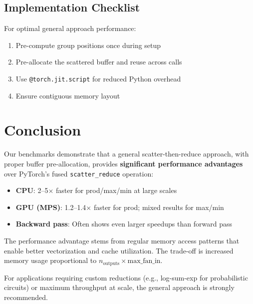 \documentclass[11pt]{article}
\begin{document}
\subsection{Implementation Checklist}

For optimal general approach performance:
\begin{enumerate}
    \item Pre-compute group positions once during setup
    \item Pre-allocate the scattered buffer and reuse across calls
    \item Use \texttt{@torch.jit.script} for reduced Python overhead
    \item Ensure contiguous memory layout
\end{enumerate}

\section{Conclusion}

Our benchmarks demonstrate that a general scatter-then-reduce approach, with proper buffer pre-allocation, provides \textbf{significant performance advantages} over PyTorch's fused \texttt{scatter\_reduce} operation:

\begin{itemize}
    \item \textbf{CPU}: 2--5$\times$ faster for prod/max/min at large scales
    \item \textbf{GPU (MPS)}: 1.2--1.4$\times$ faster for prod; mixed results for max/min
    \item \textbf{Backward pass}: Often shows even larger speedups than forward pass
\end{itemize}

The performance advantage stems from regular memory access patterns that enable better vectorization and cache utilization. The trade-off is increased memory usage proportional to $n_{\text{outputs}} \times \text{max\_fan\_in}$.

For applications requiring custom reductions (e.g., log-sum-exp for probabilistic circuits) or maximum throughput at scale, the general approach is strongly recommended.
\end{document}
